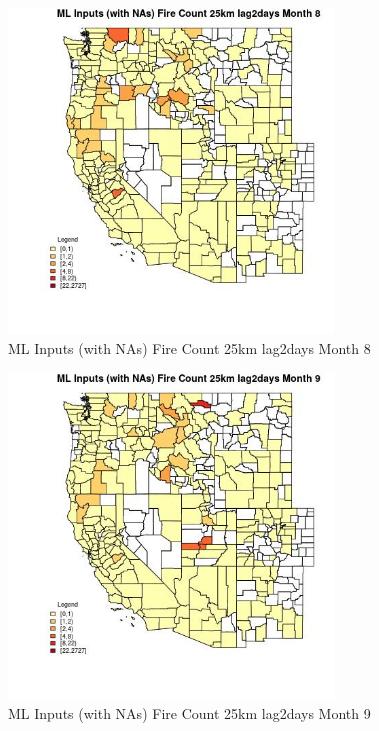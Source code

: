 \begin{figure} 
\centering  
\includegraphics[width=0.77\textwidth]{Code_Outputs/Report_ML_input_PM25_Step4_part_f_de_duplicated_aveswNAs_CountyFire_Count_25km_lag2daysmedianMonth8.jpg} 
\caption{\label{fig:Report_ML_input_PM25_Step4_part_f_de_duplicated_aveswNAsCountyFire_Count_25km_lag2daysmedianMonth8}ML Inputs (with NAs) Fire Count 25km lag2days Month 8} 
\end{figure} 
 

\begin{figure} 
\centering  
\includegraphics[width=0.77\textwidth]{Code_Outputs/Report_ML_input_PM25_Step4_part_f_de_duplicated_aveswNAs_CountyFire_Count_25km_lag2daysmedianMonth9.jpg} 
\caption{\label{fig:Report_ML_input_PM25_Step4_part_f_de_duplicated_aveswNAsCountyFire_Count_25km_lag2daysmedianMonth9}ML Inputs (with NAs) Fire Count 25km lag2days Month 9} 
\end{figure} 
 


